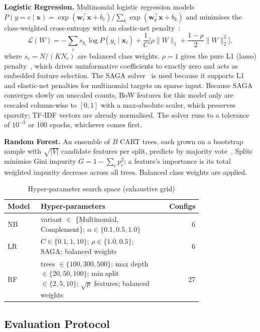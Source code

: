 \documentclass[conference]{IEEEtran}
\begin{document}
\textbf{Logistic Regression.} Multinomial logistic regression models $P(y=c\mid\mathbf{x})=\exp(\mathbf{w}_c^\top\mathbf{x}+b_c)/\sum_k\exp(\mathbf{w}_k^\top\mathbf{x}+b_k)$ and minimises the class-weighted cross-entropy with an elastic-net penalty~\cite{zou2005elasticnet}:
\begin{equation}
\mathcal{L}(W)=-\sum_i s_{y_i}\log P(y_i\mid\mathbf{x}_i)+\frac{1}{C}\Big[\rho\lVert W\rVert_1+\frac{1-\rho}{2}\lVert W\rVert_2^2\Big],
\end{equation}
where $s_c=N/(K N_c)$ are balanced class weights. $\rho=1$ gives the pure L1 (lasso) penalty~\cite{tibshirani1996lasso}, which drives uninformative coefficients to exactly zero and acts as embedded feature selection. The SAGA solver~\cite{defazio2014saga} is used because it supports L1 and elastic-net penalties for multinomial targets on sparse input. Because SAGA converges slowly on unscaled counts, BoW features for this model only are rescaled column-wise to $[0,1]$ with a max-absolute scaler, which preserves sparsity; TF-IDF vectors are already normalised. The solver runs to a tolerance of $10^{-3}$ or 100 epochs, whichever comes first.

\textbf{Random Forest.} An ensemble of $B$ CART trees, each grown on a bootstrap sample with $\sqrt{|V|}$ candidate features per split, predicts by majority vote~\cite{breiman2001rf}. Splits minimise Gini impurity $G=1-\sum_c p_c^2$; a feature's importance is its total weighted impurity decrease across all trees. Balanced class weights are applied.

\begin{table}[!htbp]
\centering
\caption{Hyper-parameter search space (exhaustive grid)}
\label{tab:grid}
\begin{tabular}{p{0.17\linewidth}p{0.6\linewidth}r}
\toprule
Model & Hyper-parameters & Configs \\
\midrule
NB & variant $\in$ \{Multinomial, Complement\}; $\alpha\in\{0.1,0.5,1.0\}$ & 6 \\
LR & $C\in\{0.1,1,10\}$; $\rho\in\{1.0,0.5\}$; SAGA; balanced weights & 6 \\
RF & trees $\in\{100,300,500\}$; max depth $\in\{20,50,100\}$; min split $\in\{2,5,10\}$; $\sqrt{p}$ features; balanced weights & 27 \\
\bottomrule
\end{tabular}
\end{table}

\subsection{Evaluation Protocol}
\end{document}
